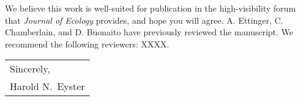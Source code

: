 \documentclass{article}
\begin{document}
We believe this work is well-suited for publication in the high-visibility forum that \textit{Journal of Ecology} provides, and hope you will agree.  A. Ettinger, C. Chamberlain, and D. Buonaito have previously reviewed the manuscript. We recommend the following reviewers: XXXX. \par 
	\bigskip
	
	\null\hfill
	\begin{tabular}{l@{}}
		Sincerely, \\[5\normalbaselineskip]
		Harold N.\ Eyster
	\end{tabular}
	
\end{document}
